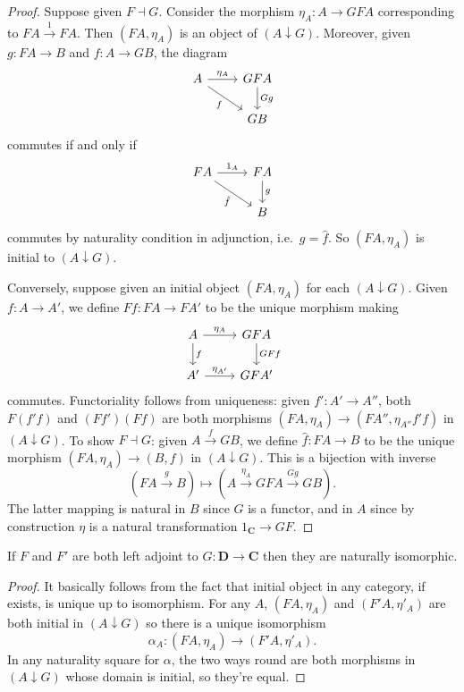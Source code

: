 \documentclass[a4paper]{article}
\renewcommand{\c}[1]{\mathbf{#1}}
\newcommand{\adjoint}{\dashv}
\begin{document}
\begin{proof}
  Suppose given \(F \adjoint G\). Consider the morphism \(\eta_A: A \to GFA\) corresponding to \(FA \xrightarrow{1} FA\). Then \((FA, \eta_A)\) is an object of \((A \downarrow G)\). Moreover, given \(g: FA \to B\) and \(f: A \to GB\), the diagram
  \[
    \begin{tikzcd}
      A \ar[r, "\eta_A"] \ar[dr, "f"'] & GFA \ar[d, "Gg"] \\
      & GB
    \end{tikzcd}
  \]
  commutes if and only if
  \[
    \begin{tikzcd}
      FA \ar[r, "1_A"] \ar[dr, "\hat f"'] & FA \ar[d, "g"] \\
      & B
    \end{tikzcd}
  \]
  commutes by naturality condition in adjunction, i.e.\ \(g = \hat f\). So \((FA, \eta_A)\) is initial to \((A \downarrow G)\).

  Conversely, suppose given an initial object \((FA, \eta_A)\) for each \((A \downarrow G)\). Given \(f: A \to A'\), we define \(Ff: FA \to FA'\) to be the unique morphism making
  \[
    \begin{tikzcd}
      A \ar[r, "\eta_A"] \ar[d, "f"] & GFA \ar[d, "GFf"] \\
      A' \ar[r, "\eta_{A'}"] & GFA'
    \end{tikzcd}
  \]
  commutes. Functoriality follows from uniqueness: given \(f': A' \to A''\), both \(F(f'f)\) and \((Ff')(Ff)\) are both morphisms \((FA, \eta_A) \to (FA'', \eta_{A''}f'f)\) in \((A \downarrow G)\). To show \(F \adjoint G\): given \(A \xrightarrow{f} GB\), we define \(\hat f: FA \to B\) to be the unique morphism \((FA, \eta_A) \to (B, f)\) in \((A \downarrow G)\). This is a bijection with inverse
  \[
    (FA \xrightarrow{g} B) \mapsto (A \xrightarrow{\eta_A} GFA \xrightarrow{Gg} GB).
  \]
  The latter mapping is natural in \(B\) since \(G\) is a functor, and in \(A\) since by construction \(\eta\) is a natural transformation \(1_{\c C} \to GF\).
\end{proof}

\begin{corollary}
  If \(F\) and \(F'\) are both left adjoint to \(G: \c D \to \c C\) then they are naturally isomorphic.
\end{corollary}

\begin{proof}
  It basically follows from the fact that initial object in any category, if exists, is unique up to isomorphism. For any \(A\), \((FA, \eta_A)\) and \((F'A, \eta'_A)\) are both initial in \((A \downarrow G)\) so there is a unique isomorphism
  \[
    \alpha_A: (FA, \eta_A) \to (F'A, \eta'_A).
  \]
  In any naturality square for \(\alpha\), the two ways round are both morphisms in \((A \downarrow G)\) whose domain is initial, so they're equal.
\end{proof}
\end{document}
